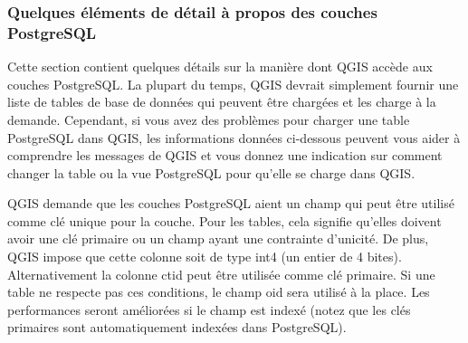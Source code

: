\subsubsection{Quelques éléments de détail à propos des couches PostgreSQL}\label{sec:postgis_details}

Cette section contient quelques détails sur la manière dont QGIS accède aux couches PostgreSQL. La plupart du temps, QGIS devrait simplement fournir une liste de tables de base de données qui peuvent être chargées et les charge à la demande. Cependant, si vous avez des problèmes pour charger une table PostgreSQL dans QGIS, les informations données ci-dessous peuvent vous aider à comprendre les messages de QGIS et vous donnez une indication sur comment changer la table ou la vue PostgreSQL pour qu'elle se charge dans QGIS.

QGIS demande que les couches PostgreSQL aient un champ qui peut être utilisé comme clé unique pour la couche. Pour les tables, cela signifie qu'elles doivent avoir une clé primaire ou un champ ayant une contrainte d'unicité. De plus, QGIS impose que cette colonne soit de type int4 (un entier de 4 bites). Alternativement la colonne ctid peut être utilisée comme clé primaire. Si une table ne respecte pas ces conditions, le champ oid sera utilisé à la place. Les performances seront améliorées si le champ est indexé (notez que les clés primaires sont automatiquement indexées dans PostgreSQL).

